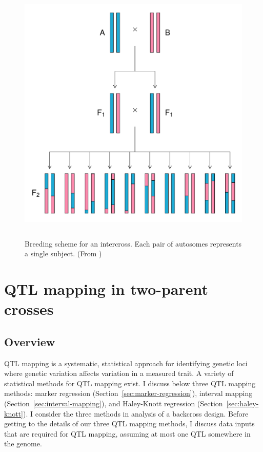 \documentclass[oneside]{book}\usepackage[]{graphicx}\usepackage[]{color}
\makeatletter
\def\maxwidth{ %
  \ifdim\Gin@nat@width>\linewidth
    \linewidth
  \else
    \Gin@nat@width
  \fi
}
\newenvironment{knitrout}{}{} %
\def\maxwidth{\ifdim\Gin@nat@width>\linewidth\linewidth\else\Gin@nat@width\fi}
\makeatother
\begin{document}
\begin{knitrout}
\color{fgcolor}\begin{figure}
\includegraphics[width=\maxwidth,height=5in]{figure/intercross-1} \caption[Breeding scheme for an intercross]{Breeding scheme for an intercross. Each pair of autosomes represents a single subject. (From \citet{broman2009guide})}\label{fig:intercross}
\end{figure}


\end{knitrout}







\section{QTL mapping in two-parent crosses}\label{sec:qtl-two-parent}

\subsection{Overview}\label{sec:overview-2-parent-qtl-mapping}

QTL mapping is a systematic, statistical approach for identifying genetic
loci where genetic variation affects variation in a measured trait. 
A variety of statistical methods for QTL mapping
exist. I discuss below three QTL mapping methods:
marker regression (Section~\ref{sec:marker-regression}), interval mapping (Section~\ref{sec:interval-mapping}), and Haley-Knott regression (Section~\ref{sec:haley-knott}). I consider
the three methods in analysis of a backcross design. 
Before getting to the details of our three QTL mapping methods, I discuss
data inputs that are required for QTL mapping, assuming at most one QTL somewhere in the genome. 
\end{document}
